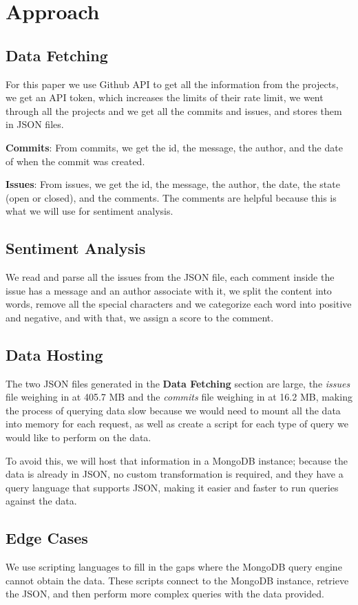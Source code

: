 \section{Approach}
\subsection{Data Fetching}
For this paper we use Github API to get all the information from the projects, we get an API token, which increases the limits of their rate limit, we went through all the projects and we get all the commits and issues, and stores them in JSON files.

\textbf{Commits}: From commits, we get the id, the message, the author, and the date of when the commit was created.

\textbf{Issues}: From issues, we get the id, the message, the author, the date, the state (open or closed), and the comments. The comments are helpful because this is what we will use for sentiment analysis.

\subsection{Sentiment Analysis}
We read and parse all the issues from the JSON file, each comment inside the issue has a message and an author associate with it, we split the content into words, remove all the special characters and we categorize each word into positive and negative, and with that, we assign a score to the comment.

\subsection{Data Hosting}
The two JSON files generated in the \textbf{Data Fetching} section are large, the \textit{issues} file weighing in at 405.7 MB and the \textit{commits} file weighing in at 16.2 MB, making the process of querying data slow because we would need to mount all the data into memory for each request, as well as create a script for each type of query we would like to perform on the data.

To avoid this, we will host that information in a MongoDB instance; because the data is already in JSON, no custom transformation is required, and they have a query language that supports JSON, making it easier and faster to run queries against the data.

\subsection{Edge Cases}
We use scripting languages to fill in the gaps where the MongoDB query engine cannot obtain the data. These scripts connect to the MongoDB instance, retrieve the JSON, and then perform more complex queries with the data provided.